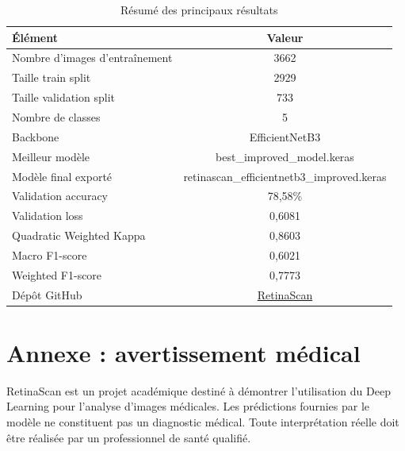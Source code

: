 \documentclass[12pt,a4paper]{report}
\begin{document}
\begin{table}[H]
\centering
\caption{Résumé des principaux résultats}
\begin{tabular}{lc}
\toprule
Élément & Valeur \\
\midrule
Nombre d'images d'entraînement & 3662 \\
Taille train split & 2929 \\
Taille validation split & 733 \\
Nombre de classes & 5 \\
Backbone & EfficientNetB3 \\
Meilleur modèle & best\_improved\_model.keras \\
Modèle final exporté & retinascan\_efficientnetb3\_improved.keras \\
Validation accuracy & 78,58\% \\
Validation loss & 0,6081 \\
Quadratic Weighted Kappa & 0,8603 \\
Macro F1-score & 0,6021 \\
Weighted F1-score & 0,7773 \\
Dépôt GitHub & \href{https://github.com/bilal-erraki/RetinaScan}{RetinaScan} \\
\bottomrule
\end{tabular}
\end{table}

\chapter{Annexe : avertissement médical}
RetinaScan est un projet académique destiné à démontrer l'utilisation du Deep Learning pour l'analyse d'images médicales. Les prédictions fournies par le modèle ne constituent pas un diagnostic médical. Toute interprétation réelle doit être réalisée par un professionnel de santé qualifié.
\end{document}
